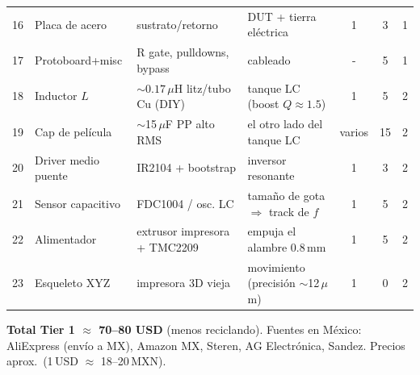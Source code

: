 \documentclass[11pt]{article}
\begin{document}
\begin{center}
\begin{tabular}{@{}clp{3.0cm}p{4.6cm}ccc@{}}
16 & Placa de acero    & sustrato/retorno         & DUT + tierra el\'ectrica                   & 1 & 3  & 1\\
17 & Protoboard+misc   & R gate, pulldowns, bypass& cableado                                  & - & 5  & 1\\
\midrule
18 & Inductor $L$      & $\sim0.17\,\mu$H litz/tubo Cu (DIY) & tanque LC (boost $Q\!\approx\!1.5$) & 1 & 5 & 2\\
19 & Cap de pel\'icula & $\sim$15\,$\mu$F PP alto RMS & el otro lado del tanque LC             & varios & 15 & 2\\
20 & Driver medio puente & IR2104 + bootstrap     & inversor resonante                        & 1 & 3 & 2\\
21 & Sensor capacitivo & FDC1004 / osc. LC        & tama\~no de gota $\Rightarrow$ track de $f$ & 1 & 5 & 2\\
22 & Alimentador       & extrusor impresora + TMC2209 & empuja el alambre 0.8\,mm             & 1 & 5 & 2\\
23 & Esqueleto XYZ     & impresora 3D vieja       & movimiento (precisi\'on $\sim$12\,$\mu$m)  & 1 & 0 & 2\\
\bottomrule
\end{tabular}
\end{center}
\noindent\textbf{Total Tier 1 $\approx$ 70--80 USD} (menos reciclando). Fuentes en M\'exico:
AliExpress (env\'io a MX), Amazon MX, Steren, AG Electr\'onica, Sandez. Precios aprox.\ (1\,USD $\approx$ 18--20\,MXN).
\end{document}
